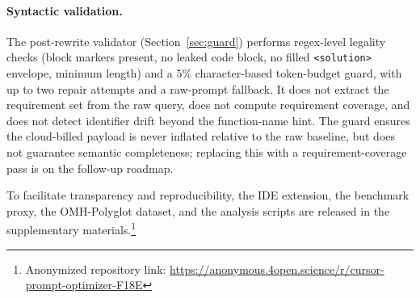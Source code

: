 \documentclass[11pt,a4paper,twocolumn]{article}
\begin{document}
\paragraph{Syntactic validation.} The post-rewrite validator (Section~\ref{sec:guard}) performs regex-level legality checks (block markers present, no leaked code block, no filled \texttt{<solution>} envelope, minimum length) and a $5\%$ character-based token-budget guard, with up to two repair attempts and a raw-prompt fallback. It does not extract the requirement set from the raw query, does not compute requirement coverage, and does not detect identifier drift beyond the function-name hint. The guard ensures the cloud-billed payload is never inflated relative to the raw baseline, but does not guarantee semantic completeness; replacing this with a requirement-coverage pass is on the follow-up roadmap.

To facilitate transparency and reproducibility, the IDE extension, the benchmark proxy, the OMH-Polyglot dataset, and the analysis scripts are released in the supplementary materials.\footnote{Anonymized repository link: \url{https://anonymous.4open.science/r/cursor-prompt-optimizer-F18E}}


\end{document}
